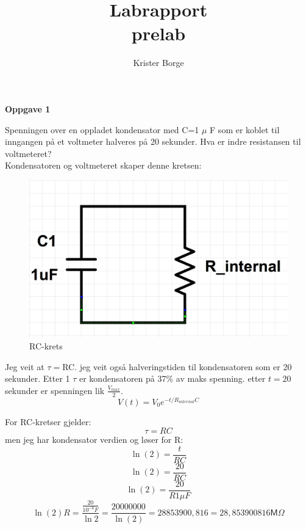 \documentclass[12pt,a4paper,leqno]{report}
\author{Krister Borge}
\title{Labrapport \\ \small{prelab}}
\begin{document}
\maketitle
\textbf{Oppgave 1}

Spenningen over en oppladet kondensator med C=1 $\mu$ F
som er koblet til inngangen på et voltmeter halveres på 20 sekunder. Hva er indre resistansen til voltmeteret?\\
Kondensatoren og voltmeteret skaper denne kretsen:
\begin{figure}[H]
\caption{RC-krets}
\centering
\includegraphics[width=\textwidth]{RC-cirquit.jpg}
\end{figure}
Jeg veit at $\tau=$RC. jeg veit også halveringstiden til kondensatoren som er 20 sekunder. Etter  1 $\tau$  er kondensatoren på 37\% av maks spenning. etter $t=20$ sekunder er spenningen lik $\frac{V_{max}}{2}$.
\begin{equation}
V(t)=V_0e^{-t/R_{internal}C}
\end{equation}

For RC-kretser gjelder:
\begin{equation}
\tau=RC
\end{equation}
men jeg har kondensator verdien og løser for R:
\begin{equation}
\ln(2)=\frac{t}{RC}
\end{equation}
\begin{equation}
\ln(2)=\frac{20}{RC}
\end{equation}
\begin{equation}
\ln(2)=\frac{20}{R1 \mu F}
\end{equation}
\begin{equation}
\ln(2)R=\frac{\frac{20}{10^{-6} F}}{\ln{2}}=\frac{20000000}{\ln(2)}=28853900,816=28,853900816\mathsf{M}\Omega
\end{equation}
\end{document}
